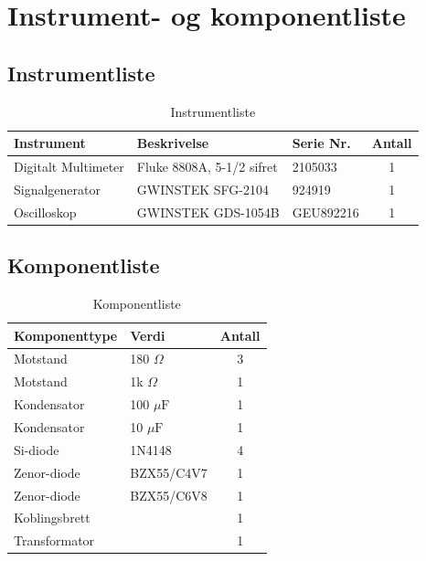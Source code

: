 \section{Instrument- og komponentliste}

\subsection{Instrumentliste}
\begin{table}[h]
    \centering
    \caption{Instrumentliste}
    \vspace{1em}
    \label{tab:instrumentliste}
    \begin{tabular}{|l|l|l|c|}
        \hline
        \rowcolor[gray]{0.9}
        \textbf{Instrument} & \textbf{Beskrivelse} & \textbf{Serie Nr.} & \textbf{Antall} \\ \hline
        Digitalt Multimeter & Fluke 8808A, 5-1/2 sifret  & 2105033 & 1 \\ \hline
        Signalgenerator & GWINSTEK SFG-2104 & 924919 & 1 \\ \hline
        Oscilloskop & GWINSTEK GDS-1054B & GEU892216 & 1 \\ \hline
    \end{tabular}
\end{table}

\subsection{Komponentliste}
\begin{table}[h]
    \centering
    \caption{Komponentliste}
    \vspace{1em}
    \label{tab:komponentliste}
    \begin{tabular}{|l|l|c|}
        \hline
        \rowcolor[gray]{0.9}
        \textbf{Komponenttype} & \textbf{Verdi} & \textbf{Antall} \\ \hline
        Motstand             & 180 $\Omega$        & 3 \\ \hline
        Motstand             & 1k $\Omega$       & 1 \\ \hline
        Kondensator             & 100 $\mu \mathrm{F}$       & 1 \\ \hline
        Kondensator             & 10 $\mu \mathrm{F}$       & 1 \\ \hline
        Si-diode             & 1N4148       & 4 \\ \hline
        Zenor-diode             & BZX55/C4V7       & 1 \\ \hline
        Zenor-diode             & BZX55/C6V8       & 1 \\ \hline
        Koblingsbrett & & 1 \\ \hline
        Transformator & & 1 \\ \hline
    \end{tabular}
\end{table}
